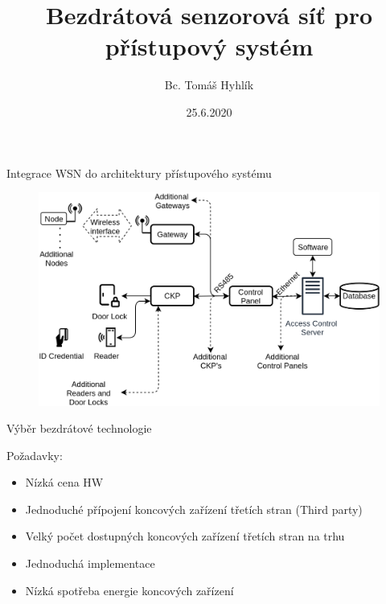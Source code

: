 \documentclass{beamer}
\title{Bezdrátová senzorová síť pro přístupový systém}
\date{25.6.2020}
\author{Bc. Tomáš Hyhlík}
\institute{Diplomová práce}
\begin{document}
  \maketitle

  

	\begin{frame}{Integrace WSN do architektury přístupového systému}

		\begin{figure}[h]
			\centering
			\includegraphics[width=1\textwidth]{ACS_IoT_extension_21}
			\label{fig:ACS architecture IMA with geteway}
		\end{figure}
			
	\end{frame}









  \begin{frame}{Výběr bezdrátové technologie}

	Požadavky:
	\begin{itemize}
		\item Nízká cena HW
		\item Jednoduché přípojení koncových zařízení třetích stran (Third party)
		\item Velký počet dostupných koncových zařízení třetích stran na trhu 
		\item Jednoduchá implementace
		\item Nízká spotřeba energie koncových zařízení
	  \end{itemize}

  \end{frame}
\end{document}

